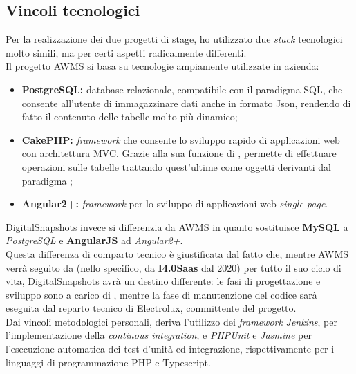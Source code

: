 \subsection{Vincoli tecnologici}

Per la realizzazione dei due progetti di stage, ho utilizzato due \textit{stack} tecnologici molto simili, ma per certi aspetti radicalmente differenti.\\
Il progetto AWMS si basa su tecnologie ampiamente utilizzate in azienda: 
\begin{itemize}
\item \textbf{PostgreSQL:} database relazionale, compatibile con il paradigma SQL, che consente all'utente di immagazzinare dati anche in formato Json, rendendo di fatto il contenuto delle tabelle molto più dinamico;
\item \textbf{CakePHP:} \textit{\gls{framework}} che consente lo sviluppo rapido di applicazioni web con architettura MVC. Grazie alla sua funzione di , permette di effettuare operazioni sulle tabelle trattando quest'ultime come oggetti derivanti dal paradigma ;
\item \textbf{Angular2+:} \textit{\gls{framework}} per lo sviluppo di applicazioni web \textit{single-page}.
\end{itemize}
DigitalSnapshots invece si differenzia da AWMS in quanto sostituisce \textbf{MySQL} a \textit{PostgreSQL} e \textbf{AngularJS} ad \textit{Angular2+}.\\
Questa differenza di comparto tecnico è giustificata dal fatto che, mentre AWMS verrà seguito da \AD{} (nello specifico, da \textbf{I4.0Saas} dal 2020) per tutto il suo ciclo di vita, DigitalSnapshots avrà un destino differente: le fasi di progettazione e sviluppo sono a carico di \AD{}, mentre la fase di manutenzione del codice sarà eseguita dal reparto tecnico di Electrolux, committente del progetto.\\
Dai vincoli metodologici personali, deriva l'utilizzo dei \textit{\gls{framework}} \textit{Jenkins}, per l'implementazione della \textit{continous integration}, e \textit{PHPUnit} e \textit{Jasmine} per l'esecuzione automatica dei test d'unità ed integrazione, rispettivamente per i linguaggi di programmazione PHP e Typescript.
